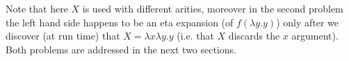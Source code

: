 \documentclass[sigconf,natbib=false,review]{acmart}
\newcommand{\UnifRel}{\ensuremath{\simeq}}
\newcommand{\Uo}{\ensuremath{\UnifRel_o}\xspace}
\newcommand{\Ue}{\ensuremath{\UnifRel_\lambda}\xspace}
\begin{document}
\noindent Note that here $X$ is used with different arities, moreover
in the second problem the left hand side happens to be an
eta expansion (of $f (\lambda y.y)$) only after we discover (at run time)
that $X = \lambda x\lambda y.y$ (i.e. that $X$ discards the $x$ argument).
Both problems are addressed in the next two sections.
  







\end{document}
